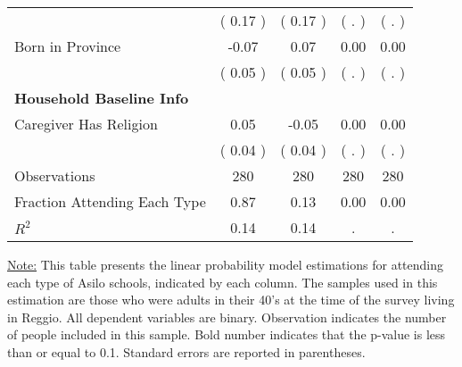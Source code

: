\begin{table}[H]
{\begin{tabular}{lcccc}
\quad  & (     0.17 ) & (     0.17 )  & (        . )  & (        . )  \\
\quad Born in Province &     -0.07 &      0.07 &      0.00 &      0.00 \\
\quad  & (     0.05 ) & (     0.05 )  & (        . )  & (        . )  \\
\midrule
\textbf{Household Baseline Info} \\
\quad Caregiver Has Religion &      0.05 &     -0.05 &      0.00 &      0.00 \\
\quad  & (     0.04 ) & (     0.04 )  & (        . )  & (        . )  \\
\midrule
Observations & 280 & 280 & 280 & 280 \\
Fraction Attending Each Type &      0.87 &      0.13 &      0.00 &      0.00 \\
\midrule
$ R^2$ &      0.14 &      0.14 &         . &         . \\
\bottomrule
\end{tabular}}
\end{table}
\begin{scriptsize}
\noindent\underline{Note:} This table presents the linear probability model estimations for attending each type of Asilo schools, indicated by each column. The samples used in this estimation are those who were adults in their 40's at the time of the survey living in Reggio. All dependent variables are binary. Observation indicates the number of people included in this sample. Bold number indicates that the p-value is less than or equal to 0.1. Standard errors are reported in parentheses.
\end{scriptsize}
